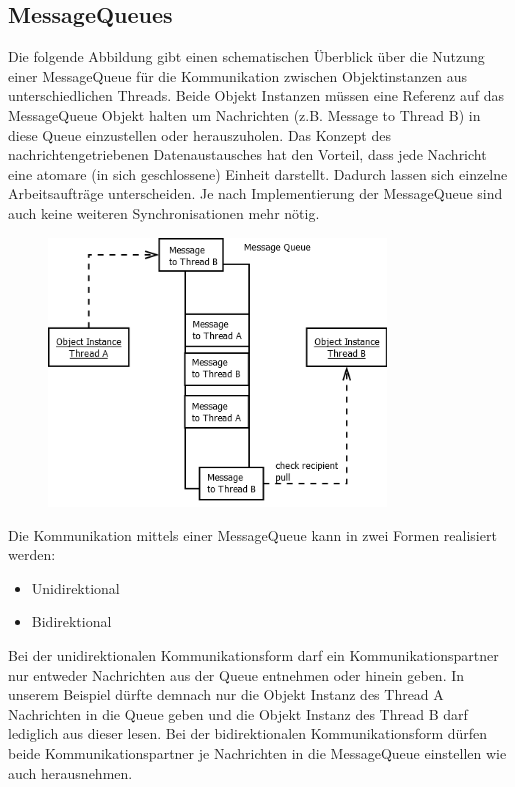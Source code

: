 \documentclass[12pt,oneside,a4paper,bibtotoc,liststotoc]{scrreprt}
\begin{document}
\subsection{MessageQueues}
Die folgende Abbildung gibt einen schematischen Überblick über die Nutzung einer MessageQueue für die Kommunikation zwischen Objektinstanzen aus unterschiedlichen Threads. Beide Objekt Instanzen müssen eine Referenz auf das MessageQueue Objekt halten um Nachrichten (z.B. Message to Thread B) in diese Queue einzustellen oder herauszuholen. Das Konzept des nachrichtengetriebenen Datenaustausches hat den Vorteil, dass jede Nachricht eine atomare (in sich geschlossene) Einheit darstellt. Dadurch lassen sich einzelne Arbeitsaufträge unterscheiden. Je nach Implementierung der MessageQueue sind auch keine weiteren Synchronisationen mehr nötig.
\begin{figure}[H]
  \begin{centering}
    \includegraphics[width=0.8\textwidth]{img/MessageQueue.png}
    \label{MessageQueue}
  \end{centering}
\end{figure}
Die Kommunikation mittels einer MessageQueue kann in zwei Formen realisiert werden:
\begin{itemize}
\item Unidirektional
\item Bidirektional
\end{itemize}
Bei der unidirektionalen Kommunikationsform darf ein Kommunikationspartner nur entweder Nachrichten aus der Queue entnehmen oder hinein geben. In unserem Beispiel dürfte demnach nur die Objekt Instanz des Thread A Nachrichten in die Queue geben und die Objekt Instanz des Thread B darf lediglich aus dieser lesen.\newline
Bei der bidirektionalen Kommunikationsform dürfen beide Kommunikationspartner je Nachrichten in die MessageQueue einstellen wie auch herausnehmen.\newline 
\newline
\end{document}
